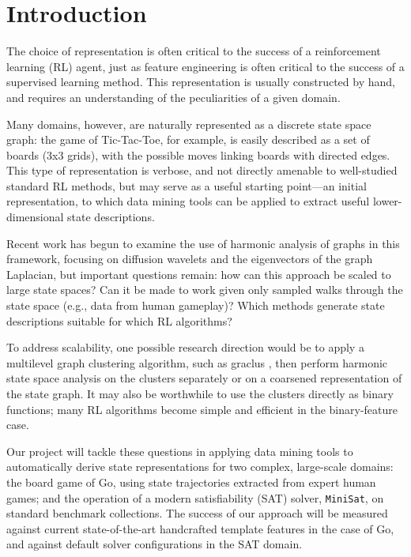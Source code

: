 \section{Introduction}

The choice of representation is often critical to the success of a
reinforcement learning (RL) agent, just as feature engineering is often
critical to the success of a supervised learning method. This representation is
usually constructed by hand, and requires an understanding of the peculiarities
of a given domain.

Many domains, however, are naturally represented as a discrete state space
graph: the game of Tic-Tac-Toe, for example, is easily described as a set of
boards (3x3 grids), with the possible moves linking boards with directed edges.
This type of representation is verbose, and not directly amenable to
well-studied standard RL methods, but may serve as a useful starting point---an
initial representation, to which data mining tools can be applied to extract
useful lower-dimensional state descriptions.

Recent work \citep{Wang2009Multiscale,Mahadevan2006Value,Coifman06Diffusion} has 
begun to examine the use of harmonic analysis of graphs in this framework, 
focusing on diffusion wavelets and the eigenvectors of the graph Laplacian, but 
important questions remain: how can this approach be scaled to large state spaces? 
Can it be made to work given only sampled walks through the state space (e.g., data 
from human gameplay)? Which methods generate state descriptions suitable for which 
RL algorithms?

To address scalability, one possible research direction would be to apply a
multilevel graph clustering algorithm, such as graclus
\citep{Dhillon07weightedgraph}, then perform harmonic state space analysis on
the clusters separately or on a coarsened representation of the state graph. It
may also be worthwhile to use the clusters directly as binary functions; many
RL algorithms become simple and efficient in the binary-feature case.  

Our project will tackle these questions in applying data mining tools to
automatically derive state representations for two complex, large-scale
domains: the board game of Go, using state trajectories extracted from expert
human games; and the operation of a modern satisfiability (SAT) solver,
\texttt{MiniSat}, on standard benchmark collections. The success of our
approach will be measured against current state-of-the-art handcrafted template
features \citep{Silver2007Shape} in the case of Go, and against default solver
configurations in the SAT domain. 

